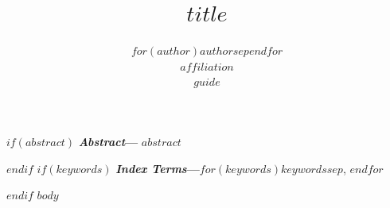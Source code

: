 \documentclass[11pt,a4paper]{article}
\title{\LARGE\bfseries $title$}
\author{\large $for(author)$$author$$sep$\quad $endfor$\\[3pt]
  \normalsize $affiliation$\\[1pt]\normalsize $guide$}
\date{}
\renewenvironment{abstract}{\noindent\small\textbf{\textit{Abstract}---}\ignorespaces}{\par\medskip}
\newcommand{\keywords}[1]{\noindent\small\textbf{\textit{Index Terms}---}#1\par\medskip}
\begin{document}
\maketitle
\thispagestyle{plain}
$if(abstract)$
\begin{abstract}
$abstract$
\end{abstract}
$endif$
$if(keywords)$
\keywords{$for(keywords)$$keywords$$sep$, $endfor$}
$endif$
$body$
\end{document}
